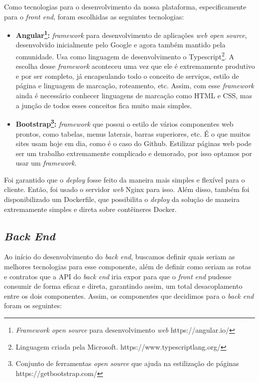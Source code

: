 \documentclass[11pt,twoside]{article}
\begin{document}
Como tecnologias para o desenvolvimento da nossa plataforma, especificamente para o \emph{front end}, foram escolhidas as seguintes tecnologias:

\begin{itemize}
  \item \textbf{Angular\footnote{\emph{Framework open source} para desenvolvimento \emph{web} https://angular.io/}:} \emph{framework} para desenvolvimento de aplicações \emph{web open source}, desenvolvido inicialmente pelo Google e agora também mantido pela comunidade. Usa como linguagem de desenvolvimento o
  Typescript\footnote{Linguagem criada pela Microsoft. https://www.typescriptlang.org/}. A escolha desse \emph{framework} aconteceu uma vez que ele é extremamente produtivo e por ser completo, já encapsulando todo o conceito de serviços, estilo de página e 
  linguagem de marcação, roteamento, etc. Assim, com esse \emph{framework} ainda é necessário conhecer linguagens de marcação como HTML e CSS, mas a junção de todos esses conceitos fica muito mais simples.
  \item \textbf{Bootstrap\footnote{Conjunto de ferramentas \emph{open source} que ajuda na estilização de páginas https://getbootstrap.com/}:} \emph{framework} que possui o estilo de vários componentes web prontos, como tabelas, menus laterais, barras superiores, etc. É o que muitos sites usam hoje em dia, como é o caso do Github.
  Estilizar páginas web pode ser um trabalho extremamente complicado e demorado, por isso optamos por usar um \emph{framework}.
\end{itemize}

Foi garantido que o \emph{deploy} fosse feito da maneira mais simples e flexível para o cliente. Então, foi usado o servidor \emph{web} Nginx para isso. Além disso, também foi disponibilizado um Dockerfile, que possibilita
o \emph{deploy} da solução de maneira extremamente simples e direta sobre contêineres Docker.

\subsection{\emph{Back End}}

Ao início do desenvolvimento do \emph{back end}, buscamos definir quais seriam as melhores tecnologias para esse componente, além de definir como seriam as rotas e contratos que a API do \emph{back end} iria expor
para que o \emph{front end} pudesse consumir de forma eficaz e direta, garantindo assim, um total desacoplamento entre os dois componentes. Assim, os componentes que decidimos para o \emph{back end} foram os seguintes:
\end{document}
